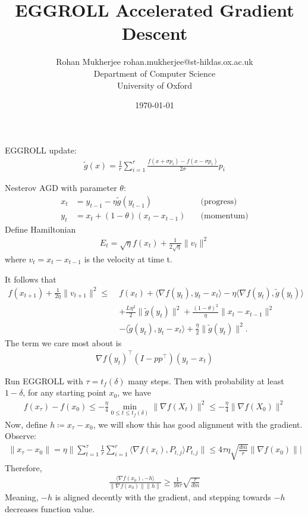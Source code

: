 \documentclass[twoside,11pt]{article}
\title{EGGROLL Accelerated Gradient Descent}
\date{\today}
\author{\name Rohan Mukherjee \email rohan.mukherjee@st-hildas.ox.ac.uk \\
\addr Department of Computer Science \\
University of Oxford}
\newcommand{\mg}[1]{\| #1 \|}
\renewcommand{\grad}{\nabla}
\newcommand{\1}{\mathbbm{1}}
\begin{document}
    \maketitle 
    EGGROLL update:
    \begin{align*}
        \tilde g(x) = \frac 1r \sum_{i=1}^r \frac{f(x+\sigma p_i) - f(x-\sigma p_i)}{2\sigma} p_i
    \end{align*}
    
    Nesterov AGD with parameter $\theta$:
    \begin{align*}
        x_{t} &= y_{t-1} - \eta \tilde g(y_{t-1}) \quad &\text{(progress)}\\
        y_t &= x_t + (1-\theta)(x_t - x_{t-1}) \quad &\text{(momentum)}
    \end{align*}
    Define Hamiltonian
    \begin{align*}
        E_t = \sqrt{\eta} f(x_{t}) + \frac{1}{2\sqrt{\eta}} \mg{v_t}^2
    \end{align*}
    where $v_t = x_t - x_{t-1}$ is the velocity at time t. 

    It follows that
    \begin{align*}
        f(x_{t+1}) + \frac{1}{2\eta} \mg{v_{t+1}}^2 
        \leq\;& f(x_t) + \langle \grad f(y_t), y_t-x_t \rangle 
        -\eta \langle \grad f(y_t), \tilde g (y_t) \rangle 
        \\& + \frac{L\eta^2}{2} \mg{\tilde g(y_t)}^2 
        + \frac{(1-\theta)^2}{\eta} \mg{x_t-x_{t-1}}^2 \\
        &-\langle \tilde g(y_t), y_t-x_t \rangle 
        + \frac{\eta}{2} \mg{\tilde g(y_t)}^2 .
    \end{align*}
    The term we care most about is
    \begin{align*}
        \grad f(y_t)^\top (I-pp^\top) (y_t-x_t)
    \end{align*}

    Run EGGROLL with $\tau = t_f(\delta)$ many steps. Then with probability at least $1-\delta$, for any starting point $x_0$, we have
    \begin{align*}
        f(x_\tau) - f(x_0) \leq -\frac{\eta}{4} \min_{0 \leq t \leq t_f(\delta)} \mg{\grad f(X_t)}^2 \leq -\frac{\eta}{4} \mg{\grad f(X_0)}^2
    \end{align*}
    Now, define $h \coloneqq x_\tau - x_0$, we will show this has good alignment with the gradient. Observe:
    \begin{align*}
        \mg{x_\tau - x_0} = \eta \mg{\sum_{t=1}^\tau \frac 1r \sum_{i=1}^r \langle \grad f(x_i), P_{t,j} \rangle P_{t,j}} \leq 4 \tau \eta \sqrt{\frac{dm}{r}} \mg{\grad f(x_0)}|
    \end{align*}
    Therefore,
    \begin{align*}
        \frac{\langle \grad f(x_0), -h \rangle}{\mg{\grad f(x_0)} \mg{h}} \geq \frac{1}{16\tau} \sqrt{\frac{r}{dm}}
    \end{align*}
    Meaning, $-h$ is aligned decently with the gradient, and stepping towards $-h$ decreases function value. 
\end{document}
